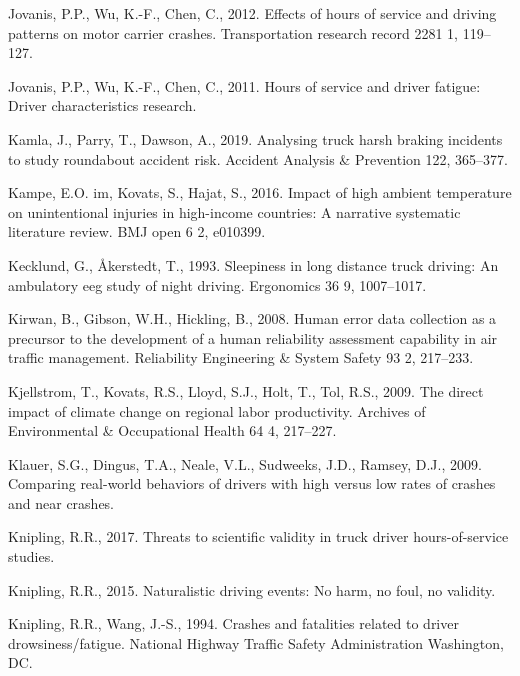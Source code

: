 \documentclass[12pt]{book}
\numberwithin{equation}{chapter}
\begin{document}
\leavevmode\hypertarget{ref-jovanis2012effects}{}%
Jovanis, P.P., Wu, K.-F., Chen, C., 2012. Effects of hours of service and driving patterns on motor carrier crashes. Transportation research record 2281 1, 119--127.

\leavevmode\hypertarget{ref-jovanis2011hours}{}%
Jovanis, P.P., Wu, K.-F., Chen, C., 2011. Hours of service and driver fatigue: Driver characteristics research.

\leavevmode\hypertarget{ref-kamla2019analysing}{}%
Kamla, J., Parry, T., Dawson, A., 2019. Analysing truck harsh braking incidents to study roundabout accident risk. Accident Analysis \& Prevention 122, 365--377.

\leavevmode\hypertarget{ref-im2016impact}{}%
Kampe, E.O. im, Kovats, S., Hajat, S., 2016. Impact of high ambient temperature on unintentional injuries in high-income countries: A narrative systematic literature review. BMJ open 6 2, e010399.

\leavevmode\hypertarget{ref-kecklund1993sleepiness}{}%
Kecklund, G., Åkerstedt, T., 1993. Sleepiness in long distance truck driving: An ambulatory eeg study of night driving. Ergonomics 36 9, 1007--1017.

\leavevmode\hypertarget{ref-kirwan2008human}{}%
Kirwan, B., Gibson, W.H., Hickling, B., 2008. Human error data collection as a precursor to the development of a human reliability assessment capability in air traffic management. Reliability Engineering \& System Safety 93 2, 217--233.

\leavevmode\hypertarget{ref-kjellstrom2009direct}{}%
Kjellstrom, T., Kovats, R.S., Lloyd, S.J., Holt, T., Tol, R.S., 2009. The direct impact of climate change on regional labor productivity. Archives of Environmental \& Occupational Health 64 4, 217--227.

\leavevmode\hypertarget{ref-klauer2009comparing}{}%
Klauer, S.G., Dingus, T.A., Neale, V.L., Sudweeks, J.D., Ramsey, D.J., 2009. Comparing real-world behaviors of drivers with high versus low rates of crashes and near crashes.

\leavevmode\hypertarget{ref-knipling2017threats}{}%
Knipling, R.R., 2017. Threats to scientific validity in truck driver hours-of-service studies.

\leavevmode\hypertarget{ref-knipling2015naturalistic}{}%
Knipling, R.R., 2015. Naturalistic driving events: No harm, no foul, no validity.

\leavevmode\hypertarget{ref-knipling1994crashes}{}%
Knipling, R.R., Wang, J.-S., 1994. Crashes and fatalities related to driver drowsiness/fatigue. National Highway Traffic Safety Administration Washington, DC.
\end{document}
